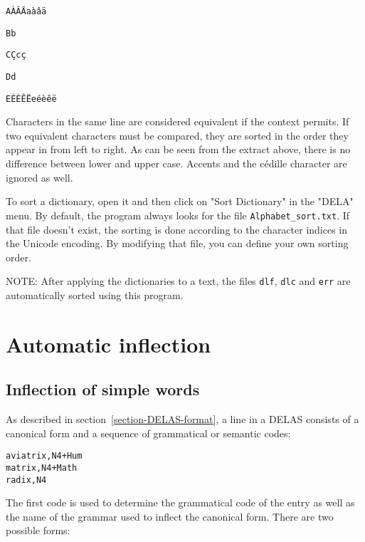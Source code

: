 \bigskip
\begin{minipage}{\textwidth}
\noindent\texttt{A\`A\^A\"Aa\`a\^a\"a}

\noindent\texttt{Bb}

\noindent\texttt{C\c{C}c\c{c}}

\noindent\texttt{Dd}

\noindent\texttt{E\'E\`E\^E\"Ee\'e\`e\^e\"e}
\end{minipage}

\bigskip
\noindent Characters in the same line are considered equivalent if the context permits. If
two equivalent characters must be compared, they are sorted in the order they
appear in from left to right. As can be seen from the extract above, there is no
difference between lower and upper case. Accents and the c\'edille character are
ignored as well.

\bigskip
\noindent To sort a dictionary, open it and then click on "Sort Dictionary" in
 the "DELA" menu. By default, the program always looks for the file
\verb+Alphabet_sort.txt+. If that file doesn't exist, the sorting is done
according to the character indices in the Unicode encoding. By modifying that
file, you can define your own sorting order.

\bigskip
\noindent NOTE: After applying the dictionaries to a text, the files
\verb+dlf+, \verb+dlc+ and \verb+err+ are automatically sorted using this
program.  



\section{Automatic inflection}
\label{section-automatic-inflection}
\subsection{Inflection of simple words}

As described in section~\ref{section-DELAS-format}, a line in a DELAS
consists of a canonical form and a sequence of grammatical or semantic codes:

\begin{verbatim}
aviatrix,N4+Hum
matrix,N4+Math
radix,N4
\end{verbatim}

\bigskip
\noindent The first code is used to determine the grammatical code of the entry as
well as the name of the grammar used to inflect the canonical form. There are
two possible forms:

